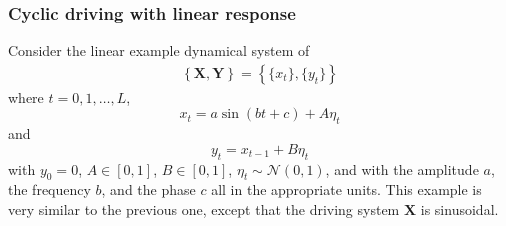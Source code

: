 \documentclass{article}[10pt]
\begin{document}
\subsubsection{Cyclic driving with linear response}
\label{sec:Cyc}
Consider the linear example dynamical system of
\begin{eqnarray}
\label{eqn:cyceqn}
\left\{\mathbf{X},\mathbf{Y}\right\} = \left\{\{x_t\},\{y_t\}\right\}
\end{eqnarray}
where $t=0,1,\ldots,L$,
\begin{equation*}
x_t = a\sin(bt+c)+A\eta_t
\end{equation*}
and
\begin{equation*}
y_t = x_{t-1} + B\eta_t
\end{equation*}
with $y_0 = 0$, $A\in[0,1]$, $B\in[0,1]$, $\eta_t\sim\mathcal{N}\left(0,1\right)$, and with the amplitude $a$, the frequency $b$, and the phase $c$ all in the appropriate units.  This example is very similar to the previous one, except that the driving system $\mathbf{X}$ is sinusoidal.
\end{document}
